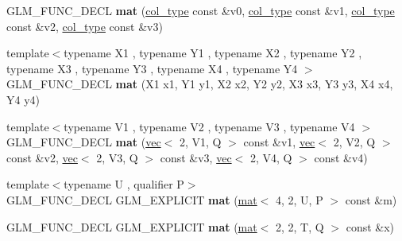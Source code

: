 \begin{DoxyCompactItemize}
\item 
\mbox{\label{structglm_1_1mat_3_014_00_012_00_01T_00_01Q_01_4_a85692129e56bea93e8608f101e716bb0}} 
G\+L\+M\+\_\+\+F\+U\+N\+C\+\_\+\+D\+E\+CL {\bfseries mat} (\hyperlink{structglm_1_1vec_3_012_00_01T_00_01Q_01_4}{col\+\_\+type} const \&v0, \hyperlink{structglm_1_1vec_3_012_00_01T_00_01Q_01_4}{col\+\_\+type} const \&v1, \hyperlink{structglm_1_1vec_3_012_00_01T_00_01Q_01_4}{col\+\_\+type} const \&v2, \hyperlink{structglm_1_1vec_3_012_00_01T_00_01Q_01_4}{col\+\_\+type} const \&v3)
\item 
\mbox{\label{structglm_1_1mat_3_014_00_012_00_01T_00_01Q_01_4_a50626dec9bd43a173c9f1e4c6d4905e7}} 
{\footnotesize template$<$typename X1 , typename Y1 , typename X2 , typename Y2 , typename X3 , typename Y3 , typename X4 , typename Y4 $>$ }\\G\+L\+M\+\_\+\+F\+U\+N\+C\+\_\+\+D\+E\+CL {\bfseries mat} (X1 x1, Y1 y1, X2 x2, Y2 y2, X3 x3, Y3 y3, X4 x4, Y4 y4)
\item 
\mbox{\label{structglm_1_1mat_3_014_00_012_00_01T_00_01Q_01_4_ac2629d879c06cb2e85df605140326870}} 
{\footnotesize template$<$typename V1 , typename V2 , typename V3 , typename V4 $>$ }\\G\+L\+M\+\_\+\+F\+U\+N\+C\+\_\+\+D\+E\+CL {\bfseries mat} (\hyperlink{structglm_1_1vec}{vec}$<$ 2, V1, Q $>$ const \&v1, \hyperlink{structglm_1_1vec}{vec}$<$ 2, V2, Q $>$ const \&v2, \hyperlink{structglm_1_1vec}{vec}$<$ 2, V3, Q $>$ const \&v3, \hyperlink{structglm_1_1vec}{vec}$<$ 2, V4, Q $>$ const \&v4)
\item 
\mbox{\label{structglm_1_1mat_3_014_00_012_00_01T_00_01Q_01_4_a597bc23f03e984f68a168562e1637582}} 
{\footnotesize template$<$typename U , qualifier P$>$ }\\G\+L\+M\+\_\+\+F\+U\+N\+C\+\_\+\+D\+E\+CL G\+L\+M\+\_\+\+E\+X\+P\+L\+I\+C\+IT {\bfseries mat} (\hyperlink{structglm_1_1mat}{mat}$<$ 4, 2, U, P $>$ const \&m)
\item 
\mbox{\label{structglm_1_1mat_3_014_00_012_00_01T_00_01Q_01_4_a5e7c4f2b22a828677945e7ffb0b88ebd}} 
G\+L\+M\+\_\+\+F\+U\+N\+C\+\_\+\+D\+E\+CL G\+L\+M\+\_\+\+E\+X\+P\+L\+I\+C\+IT {\bfseries mat} (\hyperlink{structglm_1_1mat}{mat}$<$ 2, 2, T, Q $>$ const \&x)

\end{DoxyCompactItemize}
